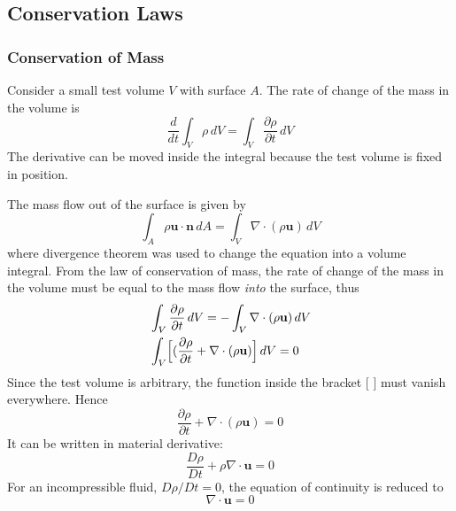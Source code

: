 \subsection{Conservation Laws}
\subsubsection{Conservation of Mass} Consider a small test volume $V$
with surface $A$. The rate of change of the mass in the volume is
\begin{equation}\label{mass:rate}
    \frac{d}{dt}\int_V\rho\,dV =
    \int_V\frac{\partial\rho}{\partial t}\,dV
\end{equation}
The derivative can be moved inside the integral because the test
volume is fixed in position.

The mass flow out of the surface is given by
\begin{equation}
    \int_A\rho\mathbf{u}\cdot\mathbf{n}\,dA =
    \int_V\nabla\cdot(\rho\mathbf{u})\,dV
\end{equation}
where divergence theorem was used to change the equation into a
volume integral.
\newslide
From the law of conservation of mass, the rate of change of the mass
in the volume must be equal to the mass flow \emph{into} the
surface, thus
\begin{align}
    &\int_V\frac{\partial\rho}{\partial t}\,dV =
    -\int_V\nabla\cdot(\rho\mathbf{u})\,dV\notag\\
    &\int_V\Bigl[(\frac{\partial\rho}{\partial t}+\nabla\cdot(\rho\mathbf{u})\Bigr]\,dV = 0\label{mass:con}
\end{align}
Since the test volume is arbitrary, the function inside the bracket
[ ] must vanish everywhere. Hence
\begin{equation}\label{mass:cont}
\boxed{\frac{\partial\rho}{\partial t}+\nabla\cdot(\rho\mathbf{u}) =
0}
\end{equation}
\newslide
It can be written in material derivative:
\begin{equation}\label{mass:cont2}
\frac{D\rho}{Dt}+\rho\nabla\cdot\mathbf{u} = 0
\end{equation}
For an incompressible fluid, $D\rho/Dt=0$, the equation of
continuity is reduced to
\begin{equation}\label{mass:cont3}
\nabla\cdot\mathbf{u} = 0
\end{equation}
\newslide
